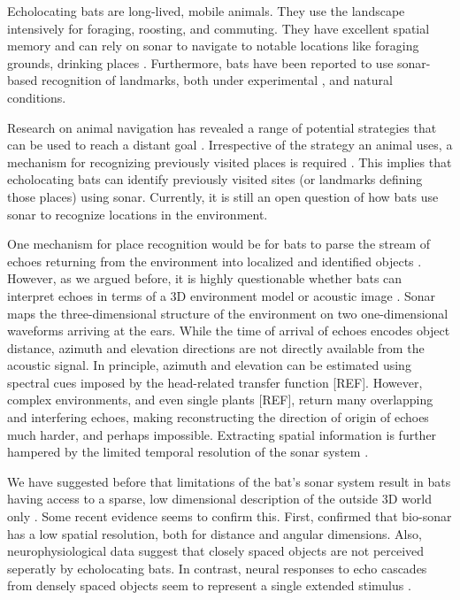 \documentclass[preprint,5p]{elsarticle}
\begin{document}
Echolocating bats are long-lived, mobile animals. They use the landscape intensively for foraging, roosting, and commuting. They have excellent spatial memory \citep{Barchi2013,VonHelversen2005} and can rely on sonar to navigate to notable locations like foraging grounds, drinking places \citep[see][for references]{Vanderelst2016,Vanderelst2017}. Furthermore, bats have been reported to use sonar-based recognition of landmarks, both under experimental \citep{Jensen2005,Yu2019}, and natural \citep{Verboom1999} conditions.

Research on animal navigation has revealed a range of potential strategies that can be used to reach a distant goal \citep[Reviewed by][]{Franz2000}. Irrespective of the strategy an animal uses, a mechanism for recognizing previously visited places is required \citep{Vanderelst2016,Vanderelst2017}. This implies that echolocating bats can identify previously visited sites (or landmarks defining those places) using sonar. Currently, it is still an open question of how bats use sonar to recognize locations in the environment.

One mechanism for place recognition would be for bats to parse the stream of echoes returning from the environment into localized and identified objects \citep{Lee2017,Barchi2013,Moss2001,Schnitzler2003,Simmons2012,Ulanovsky2008,Clare2015,Surlykke2016}. However, as we argued before, it is highly questionable whether bats can interpret echoes in terms of a 3D environment model or acoustic image \citep[e.g.,][]{Vanderelst2015,Vanderelst2016,Steckel2013}. Sonar maps the three-dimensional structure of the environment on two one-dimensional waveforms arriving at the ears. While the time of arrival of echoes encodes object distance, azimuth and elevation directions are not directly available from the acoustic signal. In principle, azimuth and elevation can be estimated using spectral cues imposed by the head-related transfer function [REF]. However, complex environments, and even single plants [REF], return many overlapping and interfering echoes, making reconstructing the direction of origin of echoes much harder, and perhaps impossible. Extracting spatial information is further hampered by the limited temporal resolution of the sonar system \citep{Simmons1989,Wiegrebe1996,Surlykke1996}. 

We have suggested before that limitations of the bat's sonar system result in bats having access to a sparse, low dimensional description of the outside 3D world only \citep{Vanderelst2015a,Vanderelst2016}. Some recent evidence seems to confirm this. First, \citet{Geberl2019} confirmed that bio-sonar has a low spatial resolution, both for distance and angular dimensions. Also, neurophysiological data suggest that closely spaced objects are not perceived seperatly by echolocating bats. In contrast, neural responses to echo cascades from densely spaced objects seem to represent a single extended stimulus \citep{Warnecke2018}. 
\end{document}
